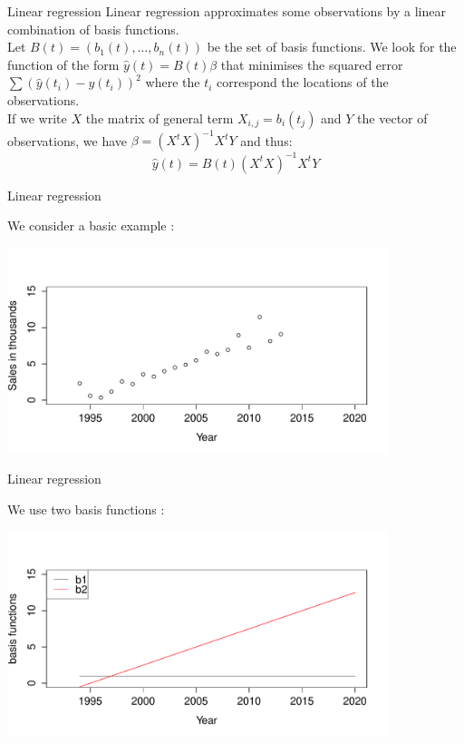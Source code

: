 \documentclass{beamer}
\begin{document}
\begin{frame}{Linear regression}
 Linear regression approximates some observations by a linear combination of basis functions. \\
 \vspace{5mm}
 Let $B(t) = (b_1(t), \dots, b_n(t))$ be the set of basis functions. We look for the function of the form $\hat{y}(t) = B(t) \beta $ that minimises the squared error $\sum (\hat{y}(t_i) - y(t_i))^2$ where the $t_i$ correspond the locations of the observations.\\
 \vspace{5mm}
 If we write $X$ the matrix of general term $X_{i,j} = b_i(t_j)$ and $Y$ the vector of observations, we have $\beta = (X^tX)^{-1}X^t Y$ and thus:
 $$ \hat{y}(t) = B(t) (X^tX)^{-1}X^t Y$$
\end{frame}

\begin{frame}{Linear regression}
\begin{example}
We consider a basic example :
\begin{center}
\includegraphics[height=6cm]{figures/3_data}
\end{center}
\end{example}
\end{frame}

\begin{frame}{Linear regression}
\begin{example}
We use two basis functions :
\begin{center}
\includegraphics[height=6cm]{figures/3_basis}
\end{center}
\end{example}
\end{frame}
\end{document}

